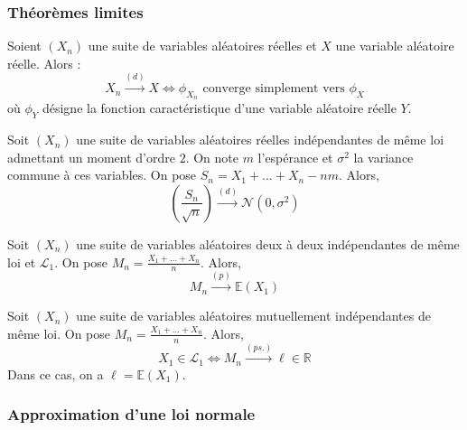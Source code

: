 	\subsubsection{Théorèmes limites}


	\begin{theorem}[Lévy]
		Soient $(X_n)$ une suite de variables aléatoires réelles et $X$ une variable aléatoire réelle. Alors :
		\[ X_n \overset{(d)}{\longrightarrow} X \iff \phi_{X_n} \text{ converge simplement vers } \phi_X \]
		où $\phi_Y$ désigne la fonction caractéristique d'une variable aléatoire réelle $Y$.
	\end{theorem}


	\begin{theorem}
		Soit $(X_n)$ une suite de variables aléatoires réelles indépendantes de même loi admettant un moment d'ordre $2$. On note $m$ l'espérance et $\sigma^2$ la variance commune à ces variables. On pose $S_n = X_1 + \dots + X_n - nm$. Alors,
		\[ \left ( \frac{S_n}{\sqrt{n}} \right) \overset{(d)}{\longrightarrow} \mathcal{N}(0, \sigma^2) \]
	\end{theorem}


	\begin{theorem}
		Soit $(X_n)$ une suite de variables aléatoires deux à deux indépendantes de même loi et $\mathcal{L}_1$. On pose $M_n = \frac{X_1 + \dots + X_n}{n}$. Alors,
		\[ M_n \overset{(p)}{\longrightarrow} \mathbb{E}(X_1) \]
	\end{theorem}


	\begin{theorem}
		Soit $(X_n)$ une suite de variables aléatoires mutuellement indépendantes de même loi. On pose $M_n = \frac{X_1 + \dots + X_n}{n}$. Alors,
		\[ X_1 \in \mathcal{L}_1 \iff M_n \overset{(ps.)}{\longrightarrow} \ell \in \mathbb{R} \]
		Dans ce cas, on a $\ell = \mathbb{E}(X_1)$.
	\end{theorem}

	\subsubsection{Approximation d'une loi normale}


